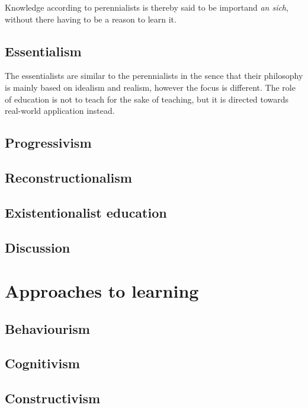 Knowledge according to perennialists is thereby said to be importand \emph{an sich}, without there having to be a reason to learn it.

\subsection{Essentialism}

The essentialists are similar to the perennialists in the sence that their philosophy is mainly based on idealism and realism, however the focus is different. The role of education is not to teach for the sake of teaching, but it is directed towards real-world application instead. 

\subsection{Progressivism}

\subsection{Reconstructionalism}

\subsection{Existentionalist education}

\subsection{Discussion}

\section{Approaches to learning}


\subsection{Behaviourism}

\subsection{Cognitivism}

\subsection{Constructivism}
